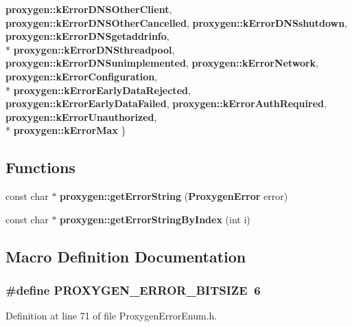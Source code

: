 \begin{DoxyCompactItemize}
{\bf proxygen\+::k\+Error\+D\+N\+S\+Other\+Client}, 
{\bf proxygen\+::k\+Error\+D\+N\+S\+Other\+Cancelled}, 
{\bf proxygen\+::k\+Error\+D\+N\+Sshutdown}, 
{\bf proxygen\+::k\+Error\+D\+N\+Sgetaddrinfo}, 
\\*
{\bf proxygen\+::k\+Error\+D\+N\+Sthreadpool}, 
{\bf proxygen\+::k\+Error\+D\+N\+Sunimplemented}, 
{\bf proxygen\+::k\+Error\+Network}, 
{\bf proxygen\+::k\+Error\+Configuration}, 
\\*
{\bf proxygen\+::k\+Error\+Early\+Data\+Rejected}, 
{\bf proxygen\+::k\+Error\+Early\+Data\+Failed}, 
{\bf proxygen\+::k\+Error\+Auth\+Required}, 
{\bf proxygen\+::k\+Error\+Unauthorized}, 
\\*
{\bf proxygen\+::k\+Error\+Max}
 \}
\end{DoxyCompactItemize}
\subsection*{Functions}
\begin{DoxyCompactItemize}
\item 
const char $\ast$ {\bf proxygen\+::get\+Error\+String} ({\bf Proxygen\+Error} error)
\item 
const char $\ast$ {\bf proxygen\+::get\+Error\+String\+By\+Index} (int i)
\end{DoxyCompactItemize}


\subsection{Macro Definition Documentation}
\subsubsection[{P\+R\+O\+X\+Y\+G\+E\+N\+\_\+\+E\+R\+R\+O\+R\+\_\+\+B\+I\+T\+S\+I\+ZE}]{\setlength{\rightskip}{0pt plus 5cm}\#define P\+R\+O\+X\+Y\+G\+E\+N\+\_\+\+E\+R\+R\+O\+R\+\_\+\+B\+I\+T\+S\+I\+ZE~6}\label{ProxygenErrorEnum_8h_a4c0963b953af57dd61527274fac95cb2}


Definition at line 71 of file Proxygen\+Error\+Enum.\+h.

